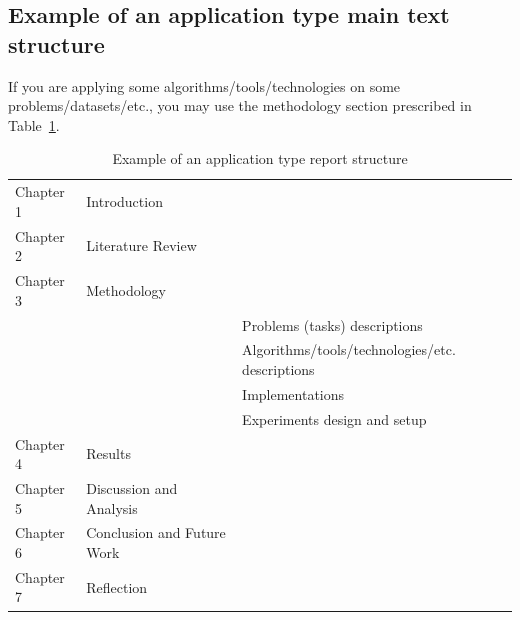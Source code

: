 \subsection{Example of an application type main text structure}
If you are applying some algorithms/tools/technologies on some problems/datasets/etc., you may use the methodology section prescribed in Table~\ref{tab:app_temp}.  
\begin{table}[!ht]
    \centering
    \caption{Example of an application type report structure}
    \label{tab:app_temp}
    \begin{tabular}{lll}     
        \toprule                   
        Chapter 1 & Introduction  &    \\        
        Chapter 2 & Literature Review  &    \\                
        Chapter 3 & Methodology   &    \\
        &               & Problems (tasks) descriptions  \\
        &               & Algorithms/tools/technologies/etc. descriptions  \\        
        &               & Implementations   \\
        &               & Experiments design and setup   \\
        Chapter 4 & Results       &  \\
        Chapter 5 & Discussion and Analysis  &    \\
        Chapter 6 & Conclusion and Future Work  &    \\        
        Chapter 7 & Reflection  &    \\          
        \bottomrule
    \end{tabular}
\end{table}

